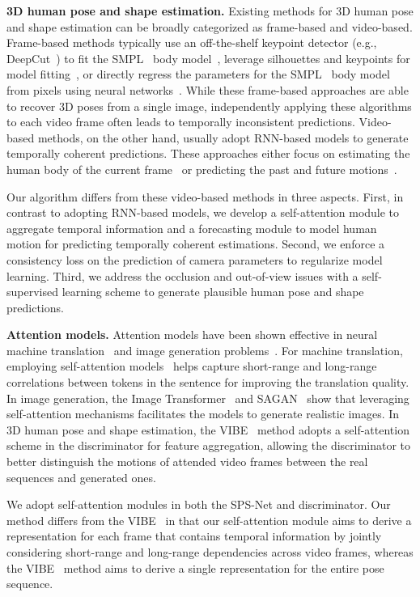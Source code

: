 \documentclass[times,referee,twocolumn,final,authoryear]{elsarticle}
\newcommand{\heading}[1]{\noindent\textbf{#1}}
\begin{document}
\heading{3D human pose and shape estimation.}
Existing methods for 3D human pose and shape estimation can be broadly categorized as frame-based and video-based.
Frame-based methods typically use an off-the-shelf keypoint detector (e.g., DeepCut~\citep{DeepCut}) to fit the SMPL~\citep{SMPL} body model~\citep{SMPLify}, leverage silhouettes and keypoints for model fitting~\citep{lassner2017unite}, or directly regress the parameters for the SMPL~\citep{SMPL} body model from pixels using neural networks~\citep{SPIN,HMR,CMR}.
While these frame-based approaches are able to recover 3D poses from a single image, independently applying these algorithms to each video frame often leads to temporally inconsistent predictions.
Video-based methods, on the other hand, usually adopt RNN-based models to generate temporally coherent predictions.
These approaches either focus on estimating the human body of the current frame~\citep{Temporal3DKinetics,sun2019human,VIBE} or predicting the past and future motions~\citep{TemporalHMR,PHD}.

Our algorithm differs from these video-based methods in three aspects.
First, in contrast to adopting RNN-based models, we develop a self-attention module to aggregate temporal information and a forecasting module to model human motion for predicting temporally coherent estimations.
Second, we enforce a consistency loss on the prediction of camera parameters to regularize model learning.
Third, we address the occlusion and out-of-view issues with a self-supervised learning scheme to generate plausible human pose and shape predictions.

\heading{Attention models.}
Attention models have been shown effective in neural machine translation~\citep{transformer} and image generation problems~\citep{SAGAN,parmar2018image}.
For machine translation, employing self-attention models~\citep{transformer} helps capture short-range and long-range correlations between tokens in the sentence for improving the translation quality.
In image generation, the Image Transformer~\citep{parmar2018image} and SAGAN~\citep{SAGAN} show that leveraging self-attention mechanisms facilitates the models to generate realistic images.
In 3D human pose and shape estimation, the VIBE~\citep{VIBE} method adopts a self-attention scheme in the discriminator for feature aggregation, allowing the discriminator to better distinguish the motions of attended video frames between the real sequences and generated ones.

We adopt self-attention modules in both the SPS-Net and discriminator.
Our method differs from the VIBE~\citep{VIBE} in that our self-attention module aims to derive a representation for each frame that contains temporal information by jointly considering short-range and long-range dependencies across video frames, whereas the VIBE~\citep{VIBE} method aims to derive a single representation for the entire pose sequence.
\end{document}
